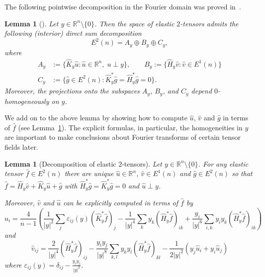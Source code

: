 \documentclass[11pt]{article}
\newcommand{\abs}[1]{\lvert #1 \rvert}
\newtheorem{lemma}[theorem]{Lemma}
\begin{document}
The following pointwise decomposition in the Fourier domain was proved in~\cite{ilmavirta2025elasticraytransform}. 

\begin{lemma}[{\cite[Lemma 10]{ilmavirta2025elasticraytransform}}]
Let $y \in \mathbb{R}^n \setminus \{0\}$. Then the space of elastic $2$-tensors admits the following (interior) direct sum decomposition
\[ E^2(n) = A_y \oplus B_y \oplus C_y, \]
where
\begin{align*}
    A_y &:= \{ \widehat{K}_y \widehat u : \widehat u \in \mathbb{R}^n,\; u \perp y\}, 
    \qquad B_y := \{ \widehat{H}_y \widehat v : \widehat v \in E^1(n) \} \\
     C_y &:= \{ \widehat g \in E^2(n) : \widehat{K}_y^{*} \widehat g = \widehat{H}_y^{*} \widehat g = 0 \}.
\end{align*}
Moreover, the projections onto the subspaces $A_y$, $B_y$, and $C_y$ depend $0$-homogeneously on $y$.
\end{lemma}

We add on to the above lemma by showing how to compute $\widehat u$, $\widehat v$ and $\widehat g$ in terms of $\widehat f$ (see Lemma~\ref{lem:E2-decomposition}). The explicit formulas, in particular, the homogeneities in $y$ are important to make conclusions about Fourier transforms of certain tensor fields later.

\begin{lemma}[Decomposition of elastic $2$-tensors]
\label{lem:E2-decomposition}
Let $y \in \mathbb{R}^n\setminus \{0\}$. For any elastic tensor $\widehat f \in E^2(n)$ there are unique $\widehat u \in \mathbb{R}^n$, $\widehat v \in E^1(n)$ and $\widehat g \in E^2(n)$ so that $\widehat f = \widehat{H}_y \widehat v + \widehat{K}_y \widehat u + \widehat g$ with $\widehat{H}^*_y\widehat g = \widehat{K}^*_y\widehat g = 0$ and $\widehat u \perp y$.

Moreover, $\widehat v$ and $\widehat u$ can be explicitly computed in terms of $\widehat f$ by
\begin{equation}
\label{eqn:hat-u}
\widehat u_i
=
\frac{4}{n-1}
\left(
\frac{1}{\abs{y}^2}
\sum_j
\varepsilon_{ij}(y)
(\widehat{K}^*_y\widehat f)_j
-
\frac{1}{\abs{y}^4}
\sum_k
y_k(\widehat{H}^*_y\widehat f)_{ik}
+
\frac{y_i}{\abs{y}^6}
\sum_{i,k}
y_iy_k
(\widehat{H}^*_y\widehat f)_{ik}
\right)
\end{equation}
and
\begin{equation}
\label{eqn:hat-v}
\widehat v_{ij}
=
\frac{2}{\abs{y}^4}
(\widehat{H}^*_y\widehat f)_{ij}
-
\frac{y_iy_j}{\abs{y}^8}
\sum_{k,l}y_ky_l
(\widehat{H}^*_y\widehat f)_{kl}
-
\frac{1}{2\abs{y}^2}(y_j\widehat u_i + y_i\widehat u_j)
\end{equation}
where $\varepsilon_{ij}(y) = \delta_{ij}-\frac{y_iy_j}{\abs{y}^{2}}$.
\end{lemma}
\end{document}
